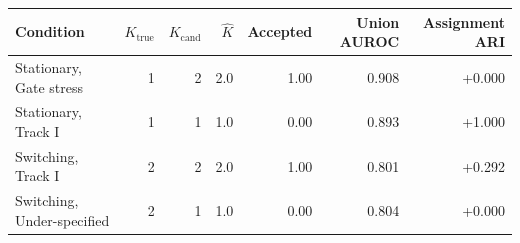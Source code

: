 \begin{tabular}{lrrrrrr}
\toprule
Condition & $K_{\mathrm{true}}$ & $K_{\mathrm{cand}}$ & $\hat K$ & Accepted & Union AUROC & Assignment ARI \\
\midrule
Stationary, Gate stress & 1 & 2 & 2.0 & 1.00 & 0.908 & +0.000 \\
Stationary, Track I & 1 & 1 & 1.0 & 0.00 & 0.893 & +1.000 \\
Switching, Track I & 2 & 2 & 2.0 & 1.00 & 0.801 & +0.292 \\
Switching, Under-specified & 2 & 1 & 1.0 & 0.00 & 0.804 & +0.000 \\
\bottomrule
\end{tabular}

